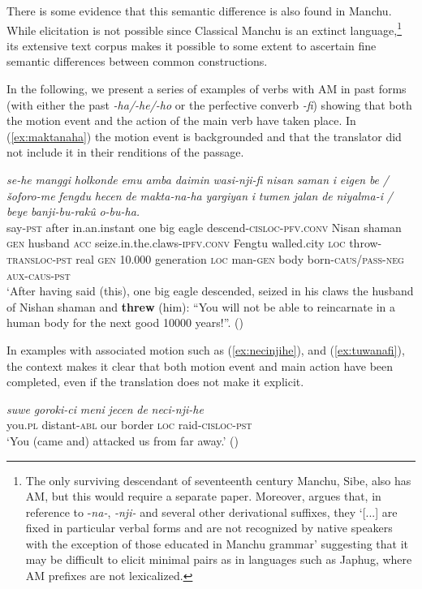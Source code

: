 \documentclass{article}
\newcommand{\ipa}[1]{\textit{{\phon\mbox{#1}}}} %
\begin{document}
There is some evidence that this semantic difference is also found in Manchu. While elicitation is not possible since Classical Manchu is an extinct language,\footnote{The only surviving descendant of seventeenth century Manchu, Sibe, also has AM, but this would require a separate paper. Moreover, \citet[178]{zikmundova13sibe} argues that, in reference to -\ipa{na-}, \ipa{-nji-} and several other derivational suffixes, they `[...] are fixed in particular verbal forms and are not recognized by native speakers with the exception of those educated in Manchu grammar' suggesting that it may be difficult to elicit minimal pairs as in languages such as Japhug, where AM prefixes are not lexicalized. } its extensive text corpus makes it possible to some extent to ascertain fine semantic differences between common constructions.

In the following, we present a series of examples of verbs with AM in past forms (with either the past \ipa{-ha/-he/-ho} or the perfective converb \ipa{-fi}) showing that both the motion event and the action of the main verb have taken place. In (\ref{ex:maktanaha}) the motion event is backgrounded and that the translator did not include it in their renditions of the passage.

\begin{exe}
\ex  \label{ex:maktanaha}
\gll
\ipa{se-he} 	\ipa{manggi} 	\ipa{holkonde} 	\ipa{emu} 	\ipa{amba} 	\ipa{daimin} 	\ipa{wasi-nji-fi} 	\ipa{nisan} 	\ipa{saman} 	\ipa{i} 	\ipa{eigen} 	\ipa{be} 	\ipa{/} 	\ipa{šoforo-me} 	\ipa{fengdu} 	\ipa{hecen} 	\ipa{de} 	\ipa{makta-na-ha} 	\ipa{yargiyan} 	\ipa{i} 	\ipa{tumen} 	\ipa{jalan} 	\ipa{de} 	\ipa{niyalma-i} 	\ipa{/} 	\ipa{beye} 	\ipa{banji-bu-rakû} 	\ipa{o-bu-ha.} \\
say-\textsc{pst} after in.an.instant one big eagle descend-\textsc{cisloc}-\textsc{pfv.conv} Nisan shaman \textsc{gen} husband \textsc{acc} { } seize.in.the.claws-\textsc{ipfv.conv} Fengtu walled.city \textsc{loc} throw-\textsc{transloc-pst} real \textsc{gen} 10.000 generation \textsc{loc} man-\textsc{gen} { } body born-\textsc{caus/pass-neg} \textsc{aux-caus-pst} \\
\glt `After having said (this), one big eagle descended, seized in his claws the husband of Nishan shaman and \textbf{threw} (him): “You will not be able to reincarnate in a human body for the next good 10000 years!”. (\citealt[85,20b/119]{jaxontov93nisan})
\end{exe}

In examples with associated motion such as (\ref{ex:necinjihe}), and (\ref{ex:tuwanafi}), the context makes it clear that both motion event and main action have been completed, even if the translation does not make it explicit.
\begin{exe}
\ex \label{ex:necinjihe}
\gll
\ipa{suwe}	\ipa{goroki-ci}	\ipa{meni}	\ipa{jecen}	\ipa{de}	\ipa{neci-nji-he}	 \\
you.\textsc{pl} distant-\textsc{abl} our border \textsc{loc} raid-\textsc{cisloc-pst} \\
\glt ‘You (came and) attacked us from far away.' (\citealt[503;870]{stary83sakda})
\end{exe}
\end{document}
